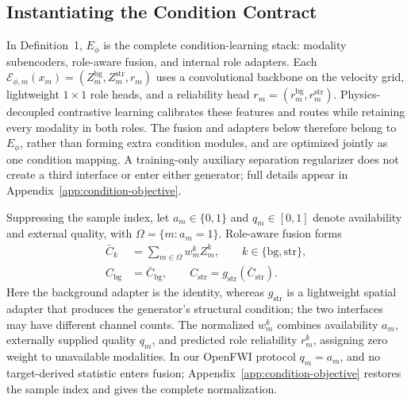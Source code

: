 \documentclass[letterpaper]{article}
\begin{document}
\subsection{Instantiating the Condition Contract}
In Definition~1, $E_\phi$ is the complete condition-learning stack: modality subencoders, role-aware fusion, and internal role adapters. Each $\mathcal E_{\phi,m}(x_m)=(Z_m^{\mathrm{bg}},Z_m^{\mathrm{str}},r_m)$ uses a convolutional backbone on the velocity grid, lightweight $1\times1$ role heads, and a reliability head $r_m=(r_m^{\mathrm{bg}},r_m^{\mathrm{str}})$. Physics-decoupled contrastive learning calibrates these features and routes while retaining every modality in both roles. The fusion and adapters below therefore belong to $E_\phi$, rather than forming extra condition modules, and are optimized jointly as one condition mapping. A training-only auxiliary separation regularizer does not create a third interface or enter either generator; full details appear in Appendix~\ref{app:condition-objective}.

Suppressing the sample index, let $a_m\in\{0,1\}$ and $q_m\in[0,1]$ denote availability and external quality, with $\Omega=\{m:a_m=1\}$. Role-aware fusion forms
\begin{align}
\bar C_k
&=\sum_{m\in\Omega}w_m^k Z_m^k,
\qquad k\in\{\mathrm{bg},\mathrm{str}\},\nonumber\\
C_{\mathrm{bg}}&=\bar C_{\mathrm{bg}},\qquad
C_{\mathrm{str}}=g_{\mathrm{str}}(\bar C_{\mathrm{str}}).
\label{eq:reliability-fusion}
\end{align}
Here the background adapter is the identity, whereas $g_{\mathrm{str}}$ is a lightweight spatial adapter that produces the generator's structural condition; the two interfaces may have different channel counts. The normalized $w_m^k$ combines availability $a_m$, externally supplied quality $q_m$, and predicted role reliability $r_m^k$, assigning zero weight to unavailable modalities. In our OpenFWI protocol $q_m=a_m$, and no target-derived statistic enters fusion; Appendix~\ref{app:condition-objective} restores the sample index and gives the complete normalization.
\end{document}
